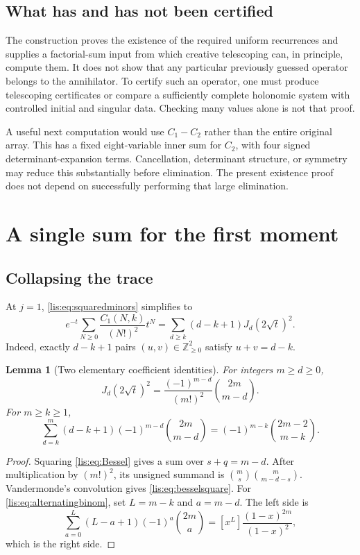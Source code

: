 \documentclass[11pt,letterpaper]{article}
\numberwithin{equation}{section}
\newtheorem{lemma}[theorem]{Lemma}
\theoremstyle{definition}
\newcommand{\Z}{\mathbb Z}
\newcommand{\coef}[2]{[#1^{#2}]}
\begin{document}
\subsection{What has and has not been certified}
The construction proves the existence of the required uniform
recurrences and supplies a factorial-sum input from which creative
telescoping can, in principle, compute them. It does not show that any
particular previously guessed operator belongs to the annihilator.
To certify such an operator, one must produce telescoping certificates
or compare a sufficiently complete holonomic system with controlled
initial and singular data. Checking many values alone is not that proof.

A useful next computation would use $C_1-C_2$ rather than the entire
original array. This has a fixed eight-variable inner sum for $C_2$,
with four signed determinant-expansion terms. Cancellation, determinant
structure, or symmetry may reduce this substantially before elimination.
The present existence proof does not depend on successfully performing
that large elimination.

\section{A single sum for the first moment}
\label{lis:sec:single}
\subsection{Collapsing the trace}
At $j=1$, \eqref{lis:eq:squaredminors} simplifies to
\begin{equation}
 e^{-t}\sum_{N\ge0}\frac{C_1(N,k)}{(N!)^2}t^N
 =\sum_{d\ge k}(d-k+1)J_d(2\sqrt t)^2.
 \label{lis:eq:trace}
\end{equation}
Indeed, exactly $d-k+1$ pairs $(u,v)\in\Z_{\ge0}^2$ satisfy
$u+v=d-k$.

\begin{lemma}[Two elementary coefficient identities]\label{lis:lem:collapse}
For integers $m\ge d\ge0$,
\begin{equation}
 \coef{t}{m}J_d(2\sqrt t)^2
 =\frac{(-1)^{m-d}}{(m!)^2}\binom{2m}{m-d}.
 \label{lis:eq:besselsquare}
\end{equation}
For $m\ge k\ge1$,
\begin{equation}
 \sum_{d=k}^{m}(d-k+1)(-1)^{m-d}\binom{2m}{m-d}
 =(-1)^{m-k}\binom{2m-2}{m-k}.
 \label{lis:eq:alternatingbinom}
\end{equation}
\end{lemma}
\begin{proof}
Squaring \eqref{lis:eq:Bessel} gives a sum over $s+q=m-d$.
After multiplication by $(m!)^2$, its unsigned summand is
$\binom ms\binom m{m-d-s}$. Vandermonde's convolution gives
\eqref{lis:eq:besselsquare}. For \eqref{lis:eq:alternatingbinom}, set
$L=m-k$ and $a=m-d$. The left side is
\[
 \sum_{a=0}^{L}(L-a+1)(-1)^a\binom{2m}{a}
 =\coef{x}{L}\frac{(1-x)^{2m}}{(1-x)^2},
\]
which is the right side.
\end{proof}
\end{document}
